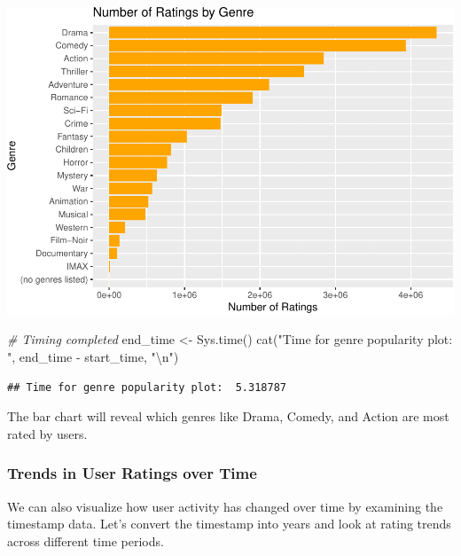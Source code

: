\documentclass[
]{article}
\newenvironment{Shaded}{}{}
\newcommand{\CommentTok}[1]{\textcolor[rgb]{0.38,0.63,0.69}{\textit{#1}}}
\newcommand{\FunctionTok}[1]{\textcolor[rgb]{0.02,0.16,0.49}{#1}}
\newcommand{\NormalTok}[1]{#1}
\newcommand{\OtherTok}[1]{\textcolor[rgb]{0.00,0.44,0.13}{#1}}
\newcommand{\SpecialCharTok}[1]{\textcolor[rgb]{0.25,0.44,0.63}{#1}}
\newcommand{\StringTok}[1]{\textcolor[rgb]{0.25,0.44,0.63}{#1}}
\begin{document}
\begin{center}\includegraphics{BI_MovieLens_Project_HarvardX_Ph125_9x_files/figure-latex/genre_popularity-1} \end{center}

\begin{Shaded}
\begin{Highlighting}[]
\CommentTok{\# Timing completed}
\NormalTok{end\_time }\OtherTok{\textless{}{-}} \FunctionTok{Sys.time}\NormalTok{()}
\FunctionTok{cat}\NormalTok{(}\StringTok{"Time for genre popularity plot: "}\NormalTok{, end\_time }\SpecialCharTok{{-}}\NormalTok{ start\_time, }\StringTok{"}\SpecialCharTok{\textbackslash{}n}\StringTok{"}\NormalTok{)}
\end{Highlighting}
\end{Shaded}

\begin{verbatim}
## Time for genre popularity plot:  5.318787
\end{verbatim}

The bar chart will reveal which genres like Drama, Comedy, and Action
are most rated by users.

\subsubsection{Trends in User Ratings over
Time}\label{trends-in-user-ratings-over-time}

We can also visualize how user activity has changed over time by
examining the timestamp data. Let's convert the timestamp into years and
look at rating trends across different time periods.
\end{document}
